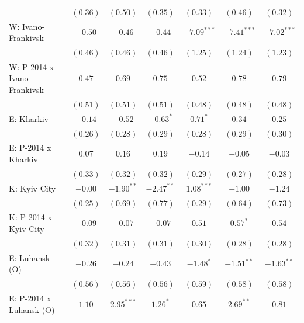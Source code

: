 \begin{table}
\begin{center}
\begin{small}
\begin{tabular}{l c c c c c c}
                            & $(0.36)$      & $(0.50)$       & $(0.35)$       & $(0.33)$       & $(0.46)$       & $(0.32)$       \\
W: Ivano-Frankivsk          & $-0.50$       & $-0.46$        & $-0.44$        & $-7.09^{***}$  & $-7.41^{***}$  & $-7.02^{***}$  \\
                            & $(0.46)$      & $(0.46)$       & $(0.46)$       & $(1.25)$       & $(1.24)$       & $(1.23)$       \\
W: P-2014 x Ivano-Frankivsk & $0.47$        & $0.69$         & $0.75$         & $0.52$         & $0.78$         & $0.79$         \\
                            & $(0.51)$      & $(0.51)$       & $(0.51)$       & $(0.48)$       & $(0.48)$       & $(0.48)$       \\
E: Kharkiv                  & $-0.14$       & $-0.52$        & $-0.63^{*}$    & $0.71^{*}$     & $0.34$         & $0.25$         \\
                            & $(0.26)$      & $(0.28)$       & $(0.29)$       & $(0.28)$       & $(0.29)$       & $(0.30)$       \\
E: P-2014 x Kharkiv         & $0.07$        & $0.16$         & $0.19$         & $-0.14$        & $-0.05$        & $-0.03$        \\
                            & $(0.33)$      & $(0.32)$       & $(0.32)$       & $(0.29)$       & $(0.27)$       & $(0.28)$       \\
K: Kyiv City                & $-0.00$       & $-1.90^{**}$   & $-2.47^{**}$   & $1.08^{***}$   & $-1.00$        & $-1.24$        \\
                            & $(0.25)$      & $(0.69)$       & $(0.77)$       & $(0.29)$       & $(0.64)$       & $(0.73)$       \\
K: P-2014 x Kyiv City       & $-0.09$       & $-0.07$        & $-0.07$        & $0.51$         & $0.57^{*}$     & $0.54$         \\
                            & $(0.32)$      & $(0.31)$       & $(0.31)$       & $(0.30)$       & $(0.28)$       & $(0.28)$       \\
E: Luhansk (O)              & $-0.26$       & $-0.24$        & $-0.43$        & $-1.48^{*}$    & $-1.51^{**}$   & $-1.63^{**}$   \\
                            & $(0.56)$      & $(0.56)$       & $(0.56)$       & $(0.59)$       & $(0.58)$       & $(0.58)$       \\
E: P-2014 x Luhansk (O)     & $1.10$        & $2.95^{***}$   & $1.26^{*}$     & $0.65$         & $2.69^{**}$    & $0.81$         \\

\end{tabular}
\end{small}
\end{center}
\end{table}
